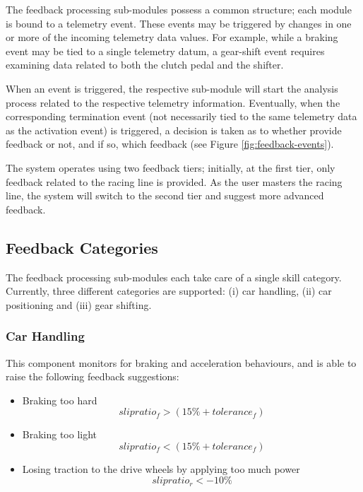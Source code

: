 The feedback processing sub-modules possess a common structure; each module is bound to a telemetry event. These events may be triggered by changes in one or more of the incoming telemetry data values. For example, while a braking event may be tied to a single telemetry datum, a gear-shift event requires examining data related to both the clutch pedal and the shifter. 

When an event is triggered, the respective sub-module will start the analysis process related to the respective telemetry information. Eventually, when the corresponding termination event (not necessarily tied to the same telemetry data as the activation event) is triggered, a decision is taken as to whether provide feedback or not, and if so, which feedback (see Figure \ref{fig:feedback-events}).

The system operates using two feedback tiers; initially, at the first tier, only feedback related to the racing line is provided. As the user masters the racing line, the system will switch to the second tier and suggest more advanced feedback.


\subsection{Feedback Categories}
The feedback processing sub-modules each take care of a single skill category. Currently, three different categories are supported: (i) car handling, (ii) car positioning and (iii) gear shifting. 

\subsubsection{Car Handling}
This component monitors for braking and acceleration behaviours, and is able to raise the following feedback suggestions:
\begin{itemize}
	\item Braking too hard \\
	\begin{equation}
		slipratio_f > (15\% + tolerance_f)
	\end{equation}
	\item Braking too light
	\begin{equation}
		slipratio_f < (15\% + tolerance_f)
	\end{equation}
	\item Losing traction to the drive wheels by applying too much power
	\begin{equation}
		slipratio_r < -10\%
	\end{equation}
\end{itemize}

